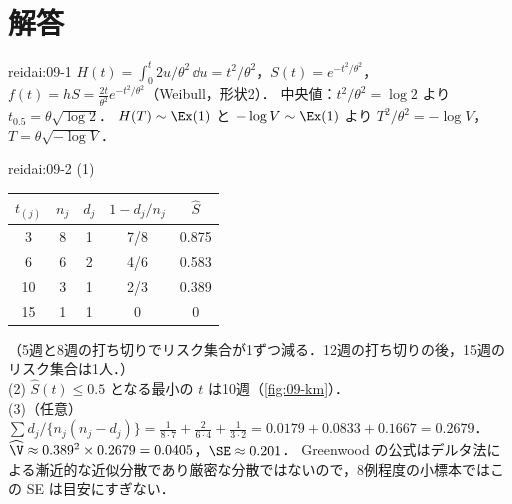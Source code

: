 \section{解答}\label{sec:09-sol}
\begin{kaitou}{reidai:09-1}
$H(t)=\int_0^t2u/\theta^2\,\dd u=t^2/\theta^2$，$S(t)=e^{-t^2/\theta^2}$，$f(t)=hS=\frac{2t}{\theta^2}e^{-t^2/\theta^2}$（Weibull，形状2）．
中央値：$t^2/\theta^2=\log2$ より $t_{0.5}=\theta\sqrt{\log2}$．
$H(T)\sim\Ex(1)$ と $-\log V\sim\Ex(1)$ より $T^2/\theta^2=-\log V$，$T=\theta\sqrt{-\log V}$．
\end{kaitou}

\begin{kaitou}{reidai:09-2}
(1)
\begin{center}\small
\begin{tabular}{@{}ccccc@{}}
\toprule
$t_{(j)}$ & $n_j$ & $d_j$ & $1-d_j/n_j$ & $\hat S$\\
\midrule
3 & 8 & 1 & 7/8 & 0.875\\
6 & 6 & 2 & 4/6 & 0.583\\
10 & 3 & 1 & 2/3 & 0.389\\
15 & 1 & 1 & 0 & 0\\
\bottomrule
\end{tabular}
\end{center}
（5週と8週の打ち切りでリスク集合が1ずつ減る．12週の打ち切りの後，15週のリスク集合は1人．）\\
(2) $\hat S(t)\le0.5$ となる最小の $t$ は10週（\cref{fig:09-km}）．\\
(3)（任意）$\sum d_j/\{n_j(n_j-d_j)\}=\frac{1}{8\cdot7}+\frac{2}{6\cdot4}+\frac{1}{3\cdot2}=0.0179+0.0833+0.1667=0.2679$．
$\widehat\V\approx0.389^2\times0.2679=0.0405$，$\SE\approx0.201$．
Greenwood の公式はデルタ法による漸近的な近似分散であり厳密な分散ではないので，8例程度の小標本ではこの SE は目安にすぎない．
\end{kaitou}

